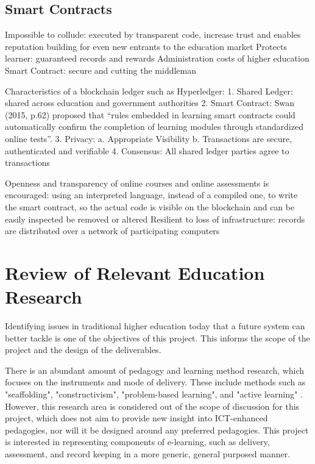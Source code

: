 \subsection{Smart Contracts}

Impossible to collude: executed by transparent code, increase trust and enables reputation building for even new entrants to 
the education market
Protects learner: guaranteed records and rewards
Administration costs of higher education
Smart Contract: secure and cutting the middleman

  




Characteristics of a blockchain ledger such as Hyperledger:
1. Shared Ledger: 
shared across education and government authorities
2. Smart Contract: 
Swan (2015, p.62) proposed that “rules embedded in learning smart contracts could automatically confirm the completion of learning modules 
through standardized online tests”.
3. Privacy: 
a. Appropriate Visibility
b. Transactions are secure, authenticated and verifiable
4. Consensus: All shared ledger parties agree to transactions

Openness and transparency of online courses and online assessments is encouraged: using an interpreted language, instead of a compiled 
one, to write the smart contract, so the actual code is visible on the blockchain and can be easily inspected
be removed or altered
Resilient to loss of infrastructure: records are distributed over a network of participating computers

\section{Review of Relevant Education Research}

Identifying issues in traditional higher education today that a future system can better 
tackle is one of the objectives of this project. This informs the scope of the 
project and the design of the deliverables.

There is an abundant amount of pedagogy and learning method research, which focuses on the 
instruments and mode of delivery. These include methods such as "scaffolding", "constructivism", 
"problem-based learning", and "active learning" \citep{ali2005effective}. However, this 
research area is considered out of the scope of discussion for this project, which does not 
aim to provide new insight into ICT-enhanced pedagogies, nor will it be designed around any 
preferred pedagogies. This project is interested in representing components of e-learning, 
such as delivery, assessment, and record keeping in a more generic, general purposed manner.

